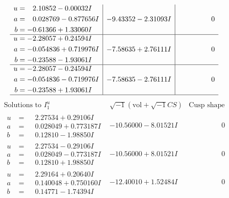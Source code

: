 \documentclass[1p]{elsarticle_modified}
\theoremstyle{definition}
\newcommand{\I}{\sqrt{-1}}
\begin{document}
$$\begin{array}{c|c|c}
\begin{aligned}
u &= \phantom{-}2.10852 - 0.00032 I \\
a &= \phantom{-}0.028769 - 0.877656 I \\
b &= -0.61366 + 1.33060 I\end{aligned}
 & -9.43352 - 2.31093 I & \phantom{-0.000000 } 0 \\ \hline\begin{aligned}
u &= -2.28057 + 0.24594 I \\
a &= -0.054836 + 0.719976 I \\
b &= -0.23588 - 1.93061 I\end{aligned}
 & -7.58635 + 2.76111 I & \phantom{-0.000000 } 0 \\ \hline\begin{aligned}
u &= -2.28057 - 0.24594 I \\
a &= -0.054836 - 0.719976 I \\
b &= -0.23588 + 1.93061 I\end{aligned}
 & -7.58635 - 2.76111 I & \phantom{-0.000000 } 0\\
 \hline 
 \end{array}$$\newpage$$\begin{array}{c|c|c}  
\text{Solutions to }I^u_{1}& \I (\text{vol} + \sqrt{-1}CS) & \text{Cusp shape}\\
 \hline 
\begin{aligned}
u &= \phantom{-}2.27534 + 0.29106 I \\
a &= \phantom{-}0.028049 + 0.773187 I \\
b &= \phantom{-}0.12810 - 1.98850 I\end{aligned}
 & -10.56000 - 8.01521 I & \phantom{-0.000000 } 0 \\ \hline\begin{aligned}
u &= \phantom{-}2.27534 - 0.29106 I \\
a &= \phantom{-}0.028049 - 0.773187 I \\
b &= \phantom{-}0.12810 + 1.98850 I\end{aligned}
 & -10.56000 + 8.01521 I & \phantom{-0.000000 } 0 \\ \hline\begin{aligned}
u &= \phantom{-}2.29164 + 0.20640 I \\
a &= \phantom{-}0.140048 + 0.750160 I \\
b &= \phantom{-}0.14771 - 1.74394 I\end{aligned}
 & -12.40010 + 1.52484 I & \phantom{-0.000000 } 0 \\ \hline\begin{aligned}

\end{aligned}
\end{array}$$
\end{document}
